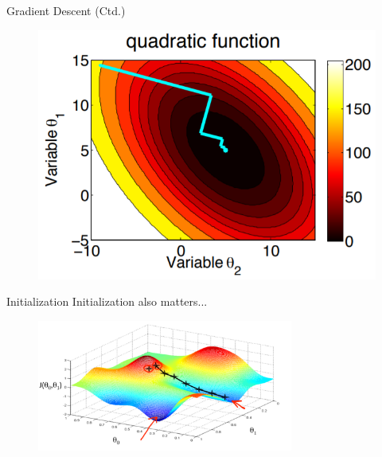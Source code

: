 \begin{frame}{Gradient Descent (Ctd.)}{}
	\begin{figure}
		\centering
		\includegraphics[scale=0.45]{02_math/02_img/gradient_descent}
	\end{figure}
\end{frame}


\begin{frame}{Initialization}{}
	Initialization also matters...
	\begin{figure}
		\centering
		\includegraphics[width=0.75\textwidth]{02_math/02_img/gradientascent}
	\end{figure}
\end{frame}


